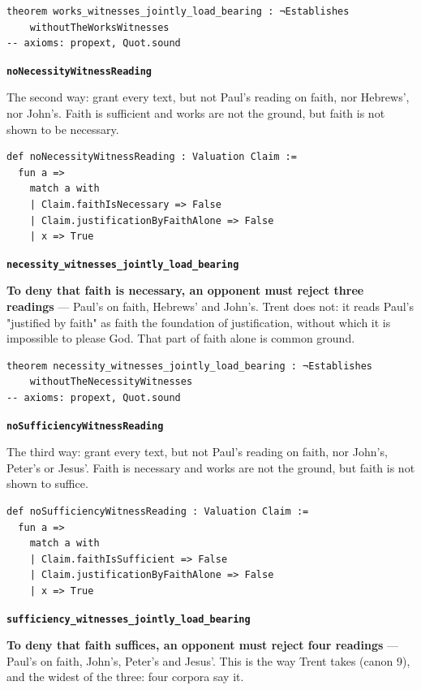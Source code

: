\documentclass[11pt]{article}
\begin{document}
{\small\begin{verbatim}
theorem works_witnesses_jointly_load_bearing : ¬Establishes
    withoutTheWorksWitnesses
-- axioms: propext, Quot.sound
\end{verbatim}}
\par\medskip\noindent\textbf{\texttt{no\allowbreak{}Necessity\allowbreak{}Witness\allowbreak{}Reading}}\par\nobreak\noindent
The second way: grant every text, but not Paul's reading on faith, nor Hebrews', nor John's. Faith is sufficient and works are not the ground, but faith is not shown to be necessary.

{\small\begin{verbatim}
def noNecessityWitnessReading : Valuation Claim :=
  fun a =>
    match a with
    | Claim.faithIsNecessary => False
    | Claim.justificationByFaithAlone => False
    | x => True
\end{verbatim}}
\par\medskip\noindent\textbf{\texttt{necessity\_\allowbreak{}witnesses\_\allowbreak{}jointly\_\allowbreak{}load\_\allowbreak{}bearing}}\par\nobreak\noindent
\textbf{To deny that faith is necessary, an opponent must reject three readings} — Paul's on faith, Hebrews' and John's. Trent does not: it reads Paul's "justified by faith" as faith the foundation of justification, without which it is impossible to please God. That part of faith alone is common ground.

{\small\begin{verbatim}
theorem necessity_witnesses_jointly_load_bearing : ¬Establishes
    withoutTheNecessityWitnesses
-- axioms: propext, Quot.sound
\end{verbatim}}
\par\medskip\noindent\textbf{\texttt{no\allowbreak{}Sufficiency\allowbreak{}Witness\allowbreak{}Reading}}\par\nobreak\noindent
The third way: grant every text, but not Paul's reading on faith, nor John's, Peter's or Jesus'. Faith is necessary and works are not the ground, but faith is not shown to suffice.

{\small\begin{verbatim}
def noSufficiencyWitnessReading : Valuation Claim :=
  fun a =>
    match a with
    | Claim.faithIsSufficient => False
    | Claim.justificationByFaithAlone => False
    | x => True
\end{verbatim}}
\par\medskip\noindent\textbf{\texttt{sufficiency\_\allowbreak{}witnesses\_\allowbreak{}jointly\_\allowbreak{}load\_\allowbreak{}bearing}}\par\nobreak\noindent
\textbf{To deny that faith suffices, an opponent must reject four readings} — Paul's on faith, John's, Peter's and Jesus'. This is the way Trent takes (canon 9), and the widest of the three: four corpora say it.
\end{document}
